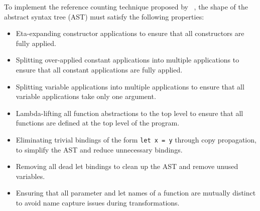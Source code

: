 


To implement the reference counting technique proposed by \citeauthor*{ullrich_counting_2021}~\cite{ullrich_counting_2021}, the shape of the abstract syntax tree (AST) must satisfy the following properties:

\begin{itemize}
    \item Eta-expanding constructor applications to ensure that all constructors are fully applied.
    \item Splitting over-applied constant applications into multiple applications to ensure that all constant applications are fully applied.
    \item Splitting variable applications into multiple applications to ensure that all variable applications take only one argument.
    \item Lambda-lifting all function abstractions to the top level to ensure that all functions are defined at the top level of the program.
    \item Eliminating trivial bindings of the form \lstinline|let x = y| through copy propagation, to simplify the AST and reduce unnecessary bindings.
    \item Removing all dead let bindings to clean up the AST and remove unused variables.
    \item Ensuring that all parameter and let names of a function are mutually distinct to avoid name capture issues during transformations.
\end{itemize}

